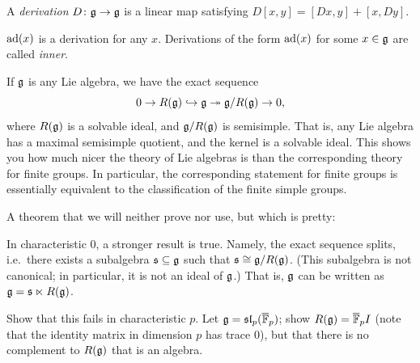 \begin{definition}
A \emph{derivation} $D\colon \mathfrak{g} \to \mathfrak{g}$ is a linear map satisfying
$D[x, y] = [Dx, y] + [x, Dy]$.
\end{definition}

\begin{example}
$\operatorname{ad}(x)$ is a derivation for any $x$. Derivations of the form $\operatorname{ad}(x)$ for some
$x \in \mathfrak{g}$ are called \emph{inner}.
\end{example}

\begin{remark}
If $\mathfrak{g}$ is any Lie algebra, we have the exact sequence
\[
  0 \to R(\mathfrak{g}) \hookrightarrow \mathfrak{g} \twoheadrightarrow \mathfrak{g}/R(\mathfrak{g}) \to 0,
\]
where $R(\mathfrak{g})$ is a solvable ideal, and $\mathfrak{g}/R(\mathfrak{g})$ is semisimple. That is, any
Lie algebra has a maximal semisimple quotient, and the kernel is a solvable
ideal. This shows you how much nicer the theory of Lie algebras is than the
corresponding theory for finite groups. In particular, the corresponding
statement for finite groups is essentially equivalent to the classification of
the finite simple groups.
\end{remark}

A theorem that we will neither prove nor use, but which is pretty:

\begin{theorem}
In characteristic $0$, a stronger result is true. Namely, the exact sequence
splits, i.e.\ there exists a subalgebra $\mathfrak{s} \subseteq \mathfrak{g}$ such that
$\mathfrak{s} \cong \mathfrak{g}/R(\mathfrak{g})$. (This subalgebra is not canonical; in particular, it is
not an ideal of $\mathfrak{g}$.) That is, $\mathfrak{g}$ can be written as
$\mathfrak{g} = \mathfrak{s} \ltimes R(\mathfrak{g})$.
\end{theorem}

\begin{exercise}
Show that this fails in characteristic $p$. Let $\mathfrak{g} = \mathfrak{sl}_p(\overline{\mathbb{F}}_p)$; show
$R(\mathfrak{g}) = \overline{\mathbb{F}}_p I$ (note that the identity matrix in dimension $p$ has trace
$0$), but that there is no complement to $R(\mathfrak{g})$ that is an algebra.
\end{exercise}

